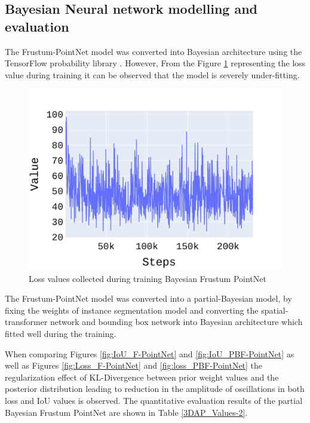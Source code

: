 \documentclass[10pt,twocolumn,letterpaper]{article}
\begin{document}
\subsection{Bayesian Neural network modelling and evaluation}
The Frustum-PointNet model was converted into Bayesian architecture using the TensorFlow probability library \cite{Tran2019}. However, From the Figure \ref{fig:Loss_BF-PointNet} representing the loss value during training it can be observed that the model is severely under-fitting.
\begin{figure}[!htbp]
	\centering
	\includegraphics[scale = 0.4]{./images/loss.pdf}
	\caption{Loss values collected during training Bayesian Frustum PointNet}
	\label{fig:Loss_BF-PointNet}
\end{figure}

The Frustum-PointNet model was converted into a partial-Bayesian model, by fixing the weights of instance segmentation model and converting the spatial-transformer network and bounding box network into Bayesian architecture which fitted well during the training. 

When comparing Figures \ref{fig:IoU_F-PointNet} and \ref{fig:IoU_PBF-PointNet} as well as Figures \ref{fig:Loss_F-PointNet} and \ref{fig:loss_PBF-PointNet} the regularization effect of KL-Divergence between prior weight values and the posterior distribution leading to reduction in the amplitude of oscillations in both loss and IoU values is observed. The quantitative evaluation results of the partial Bayesian Frustum PointNet are shown in Table \ref{3DAP_Values-2}.
\end{document}
